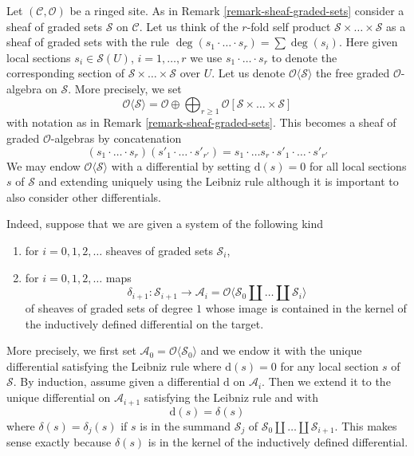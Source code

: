 \documentclass{stacks-project}
\theoremstyle{plain}
\theoremstyle{definition}
\theoremstyle{remark}
\numberwithin{equation}{subsection}
\begin{document}
\medskip\noindent
Let $(\mathcal{C}, \mathcal{O})$ be a ringed site. As in
Remark \ref{remark-sheaf-graded-sets} consider a
sheaf of graded sets $\mathcal{S}$ on $\mathcal{C}$.
Let us think of the $r$-fold self product
$\mathcal{S} \times \ldots \times \mathcal{S}$
as a sheaf of graded sets with the rule
$\deg(s_1 \cdot \ldots \cdot s_r) = \sum \deg(s_i)$.
Here given local sections $s_i \in \mathcal{S}(U)$, $i = 1, \ldots, r$
we use $s_1 \cdot \ldots \cdot s_r$
to denote the corresponding section of
$\mathcal{S} \times \ldots \times \mathcal{S}$
over $U$. Let us denote $\mathcal{O}\langle \mathcal{S} \rangle$
the free graded $\mathcal{O}$-algebra on $\mathcal{S}$.
More precisely, we set
$$
\mathcal{O}\langle \mathcal{S} \rangle =
\mathcal{O} \oplus
\bigoplus\nolimits_{r \geq 1}
\mathcal{O}[\mathcal{S} \times \ldots \times \mathcal{S}]
$$
with notation as in Remark \ref{remark-sheaf-graded-sets}.
This becomes a sheaf of graded $\mathcal{O}$-algebras by
concatenation
$$
(s_1 \cdot \ldots \cdot s_r)  (s'_1 \cdot \ldots \cdot s'_{r'}) =
s_1 \cdot \ldots s_r \cdot s'_1 \cdot \ldots \cdot s'_{r'}
$$
We may endow $\mathcal{O}\langle \mathcal{S} \rangle$
with a differential by setting $\text{d}(s) = 0$
for all local sections $s$ of $\mathcal{S}$
and extending uniquely using the Leibniz rule
although it is important to also consider other differentials.

\medskip\noindent
Indeed, suppose that we are given a system of the following kind
\begin{enumerate}
\item for $i = 0, 1, 2, \ldots$ sheaves of graded sets $\mathcal{S}_i$,
\item for $i = 0, 1, 2, \ldots$ maps
$$
\delta_{i + 1} : \mathcal{S}_{i + 1}
\longrightarrow
\mathcal{A}_i =
\mathcal{O}\langle \mathcal{S}_0 \amalg \ldots \amalg \mathcal{S}_i\rangle
$$
of sheaves of graded sets of degree $1$ whose image is contained
in the kernel of the inductively defined differential on the target.
\end{enumerate}
More precisely, we first set
$\mathcal{A}_0 = \mathcal{O}\langle \mathcal{S}_0 \rangle$
and we endow it with the unique differential satisfying the Leibniz rule
where $\text{d}(s) = 0$ for any local section $s$ of $\mathcal{S}$.
By induction, assume given a differential $\text{d}$
on $\mathcal{A}_i$. Then we extend it to the unique
differential on $\mathcal{A}_{i + 1}$ satisfying the Leibniz rule and
with
$$
\text{d}(s) = \delta(s)
$$
where $\delta(s) = \delta_j(s)$ if $s$ is in the summand $\mathcal{S}_j$ of
$\mathcal{S}_0 \amalg \ldots \amalg \mathcal{S}_{i + 1}$.
This makes sense exactly because $\delta(s)$ is in the kernel
of the inductively defined differential.
\end{document}
